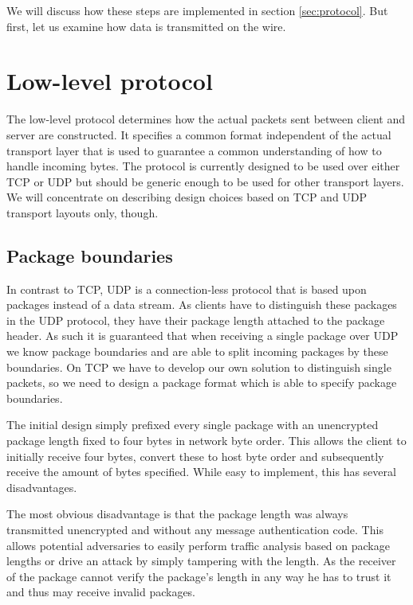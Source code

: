 We will discuss how these steps are implemented in section \ref{sec:protocol}.
But first, let us examine how data is transmitted on the wire.

\section{Low-level protocol}
\label{sec:low-level-protocol}

The low-level protocol determines how the actual packets sent between client and server are constructed.
It specifies a common format independent of the actual transport layer that is used to guarantee a common understanding of how to handle incoming bytes.
The protocol is currently designed to be used over either TCP or UDP but should be generic enough to be used for other transport layers.
We will concentrate on describing design choices based on TCP and UDP transport layouts only, though.

\subsection{Package boundaries}

In contrast to TCP, UDP is a connection-less protocol that is based upon packages instead of a data stream.
As clients have to distinguish these packages in the UDP protocol, they have their package length attached to the package header.
As such it is guaranteed that when receiving a single package over UDP we know package boundaries and are able to split incoming packages by these boundaries.
On TCP we have to develop our own solution to distinguish single packets, so we need to design a package format which is able to specify package boundaries.

The initial design simply prefixed every single package with an unencrypted package length fixed to four bytes in network byte order.
This allows the client to initially receive four bytes, convert these to host byte order and subsequently receive the amount of bytes specified.
While easy to implement, this has several disadvantages.

The most obvious disadvantage is that the package length was always transmitted unencrypted and without any message authentication code.
This allows potential adversaries to easily perform traffic analysis based on package lengths or drive an attack by simply tampering with the length.
As the receiver of the package cannot verify the package's length in any way he has to trust it and thus may receive invalid packages.

